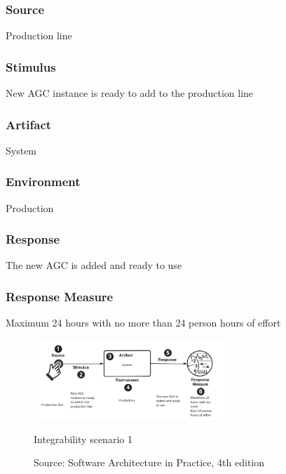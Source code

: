 \subsubsection{Source}
Production line

\subsubsection{Stimulus}
New AGC instance is ready to add to the production line

\subsubsection{Artifact}
System

\subsubsection{Environment}
Production

\subsubsection{Response}
The new AGC is added and ready to use

\subsubsection{Response Measure}
Maximum 24 hours with no more than 24 person hours of effort
\begin{figure}[h]
\centering
  \includegraphics[height=3cm]{images/qa_scenario_deploy_new_agc.png}
  \caption{Integrability scenario 1}
  \caption*{Source: Software Architecture in Practice, 4th edition \cite{bass2021software}}
  \label{fig:qa_integrability_scenario_1}
\end{figure}


